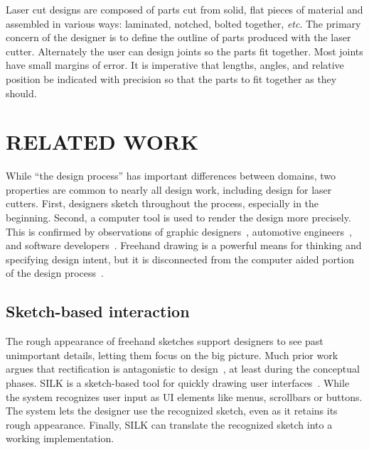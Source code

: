 \documentclass{article}
\begin{document}
Laser cut designs are composed of parts cut from solid, flat pieces of
material and assembled in various ways: laminated, notched, bolted
together, \textit{etc}. The primary concern of the designer is to
define the outline of parts produced with the laser
cutter. Alternately the user can design joints so the parts fit
together. Most joints have small margins of error. It is imperative
that lengths, angles, and relative position be indicated with
precision so that the parts to fit together as they should.

\section{RELATED WORK}

While ``the design process'' has important differences between
domains, two properties are common to nearly all design work,
including design for laser cutters. First, designers sketch throughout
the process, especially in the beginning. Second, a computer tool is
used to render the design more precisely. This is confirmed by
observations of graphic designers~\cite{wong-rr-prototypes},
automotive engineers~\cite{kara-styling}, and software
developers~\cite{dekel-improvised-notation}. Freehand drawing is a
powerful means for thinking and specifying design intent, but it is
disconnected from the computer aided portion of the design
process~\cite{company-sketching-in-engineering}.

\subsection{Sketch-based interaction}




The rough appearance of freehand sketches support designers to see
past unimportant details, letting them focus on the big picture. Much
prior work argues that rectification is antagonistic to
design~\cite{gross-cocktail}, at least during the conceptual
phases. SILK is a sketch-based tool for quickly drawing user
interfaces~\cite{landay-silk-chi}. While the system recognizes user
input as UI elements like menus, scrollbars or buttons. The system
lets the designer use the recognized sketch, even as it retains its
rough appearance. Finally, SILK can translate the recognized sketch
into a working implementation.
\end{document}
